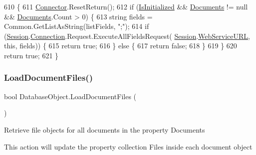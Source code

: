 \begin{DoxyCode}
610                                                      \{
611         \mbox{\hyperlink{class_connector}{Connector}}.ResetReturn();
612         \textcolor{keywordflow}{if} (\mbox{\hyperlink{class_database_object_a5fe036d32a30eb10d1b3f6a30263f740}{IsInitialized}} && \mbox{\hyperlink{class_database_object_afaf1159aa427c5bcce01c4b8c6f34514}{Documents}} != null && 
      \mbox{\hyperlink{class_database_object_afaf1159aa427c5bcce01c4b8c6f34514}{Documents}}.Count > 0) \{
613             \textcolor{keywordtype}{string} fields = Common.GetListAsString(listFields, \textcolor{stringliteral}{";"});
614             \textcolor{keywordflow}{if} (\mbox{\hyperlink{class_database_object_aa8484162b7d2a7c4c9426bca13c64c07}{Session}}.\mbox{\hyperlink{class_session_object_a014bdbf705a753540e19bfb53030c55c}{Connection}}.Request.ExecuteAllFieldsRequest(
      \mbox{\hyperlink{class_database_object_aa8484162b7d2a7c4c9426bca13c64c07}{Session}}.\mbox{\hyperlink{class_session_object_a697c071c812fbf7ad1166b896fb44c16}{WebServiceURL}}, \textcolor{keyword}{this}, fields)) \{
615                 \textcolor{keywordflow}{return} \textcolor{keyword}{true};
616             \} \textcolor{keywordflow}{else} \{
617                 \textcolor{keywordflow}{return} \textcolor{keyword}{false};
618             \}
619         \}
620         \textcolor{keywordflow}{return} \textcolor{keyword}{true};
621     \}
\end{DoxyCode}
\mbox{\label{class_database_object_acdf5c9ee898d4473350a2f4878af5a23}} 
\subsubsection{\texorpdfstring{Load\+Document\+Files()}{LoadDocumentFiles()}}
{\footnotesize\ttfamily bool Database\+Object.\+Load\+Document\+Files (\begin{DoxyParamCaption}{ }\end{DoxyParamCaption})}



Retrieve file objects for all documents in the property \textquotesingle{}Documents\textquotesingle{} 

This action will update the property collection Files inside each document object

